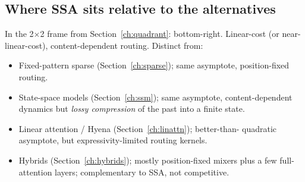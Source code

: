 \subsection{Where SSA sits relative to the alternatives}

In the 2$\times$2 frame from Section~\ref{ch:quadrant}: bottom-right.
Linear-cost (or near-linear-cost), content-dependent routing. Distinct
from:

\begin{itemize}
\item Fixed-pattern sparse (Section~\ref{ch:sparse}); same asymptote,
position-fixed routing.
\item State-space models (Section~\ref{ch:ssm}); same asymptote,
content-dependent dynamics but \emph{lossy compression} of the past into
a finite state.
\item Linear attention / Hyena (Section~\ref{ch:linattn}); better-than-
quadratic asymptote, but expressivity-limited routing kernels.
\item Hybrids (Section~\ref{ch:hybrids}); mostly position-fixed mixers
plus a few full-attention layers; complementary to SSA, not competitive.
\end{itemize}

